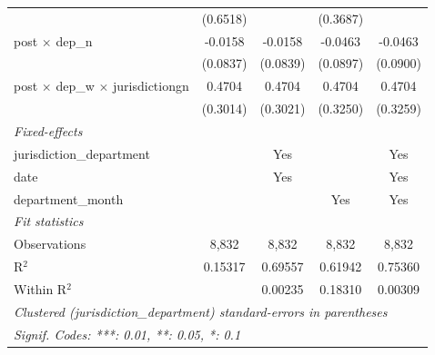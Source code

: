 \begin{tabular}{lcccc}
                                                   & (0.6518)        &          & (0.3687)        &   \\   
   post $\times$ dep\_n                            & -0.0158         & -0.0158  & -0.0463         & -0.0463\\   
                                                   & (0.0837)        & (0.0839) & (0.0897)        & (0.0900)\\   
   post $\times$ dep\_w $\times$ jurisdictiongn    & 0.4704          & 0.4704   & 0.4704          & 0.4704\\   
                                                   & (0.3014)        & (0.3021) & (0.3250)        & (0.3259)\\   
   \midrule
   \emph{Fixed-effects}\\
   jurisdiction\_department                        &                 & Yes      &                 & Yes\\  
   date                                            &                 & Yes      &                 & Yes\\  
   department\_month                               &                 &          & Yes             & Yes\\  
   \midrule
   \emph{Fit statistics}\\
   Observations                                    & 8,832           & 8,832    & 8,832           & 8,832\\  
   R$^2$                                           & 0.15317         & 0.69557  & 0.61942         & 0.75360\\  
   Within R$^2$                                    &                 & 0.00235  & 0.18310         & 0.00309\\  
   \midrule \midrule
   \multicolumn{5}{l}{\emph{Clustered (jurisdiction\_department) standard-errors in parentheses}}\\
   \multicolumn{5}{l}{\emph{Signif. Codes: ***: 0.01, **: 0.05, *: 0.1}}\\
\end{tabular}
\par\endgroup
